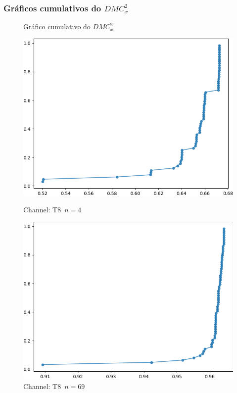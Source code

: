 \documentclass[11pt, aspectratio=169]{beamer}
\newcommand{\dmc}{\(DMC_x^2\) }
\begin{document}
\begin{frame}

  \frametitle{Gráficos cumulativos do \dmc}
\begin{figure}[ht]
  \caption{Gráfico cumulativo do \dmc}
  \begin{minipage}[b]{0.45\textwidth}
    \includegraphics[width=\textwidth]{../Figures/test_dmc/pdcca_of_T8.._n_4.png}
    \caption{Channel: T8~$n = 4$}
  \end{minipage}
  \hfill
  \begin{minipage}[b]{0.45\textwidth}
    \includegraphics[width=\textwidth]{../Figures/test_dmc/pdcca_of_T8.._n_69.png}
    \caption{Channel: T8~$n = 69$}
  \end{minipage}
\end{figure}
\end{frame}
\end{document}
